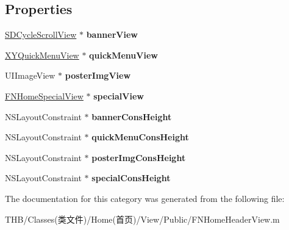 \subsection*{Properties}
\begin{DoxyCompactItemize}
\item 
\mbox{\label{category_f_n_home_header_view_07_08_af37cb7c4de6a8d9a820215c46d24a88c}} 
\mbox{\hyperlink{interface_s_d_cycle_scroll_view}{S\+D\+Cycle\+Scroll\+View}} $\ast$ {\bfseries banner\+View}
\item 
\mbox{\label{category_f_n_home_header_view_07_08_a2f5bf66710f9235beb675e6f5265e090}} 
\mbox{\hyperlink{interface_x_y_quick_menu_view}{X\+Y\+Quick\+Menu\+View}} $\ast$ {\bfseries quick\+Menu\+View}
\item 
\mbox{\label{category_f_n_home_header_view_07_08_a85fddf519f0f967812c1fb0311ae62de}} 
U\+I\+Image\+View $\ast$ {\bfseries poster\+Img\+View}
\item 
\mbox{\label{category_f_n_home_header_view_07_08_a46b32b9b072be4294511331ae5f3ac41}} 
\mbox{\hyperlink{interface_f_n_home_special_view}{F\+N\+Home\+Special\+View}} $\ast$ {\bfseries special\+View}
\item 
\mbox{\label{category_f_n_home_header_view_07_08_a39c38229dc56f5a98762cd55ab34f6b5}} 
N\+S\+Layout\+Constraint $\ast$ {\bfseries banner\+Cons\+Height}
\item 
\mbox{\label{category_f_n_home_header_view_07_08_ae6f2c2144e86d8f184e227287db3925f}} 
N\+S\+Layout\+Constraint $\ast$ {\bfseries quick\+Menu\+Cons\+Height}
\item 
\mbox{\label{category_f_n_home_header_view_07_08_aa357062827f44d01947a705236e7499a}} 
N\+S\+Layout\+Constraint $\ast$ {\bfseries poster\+Img\+Cons\+Height}
\item 
\mbox{\label{category_f_n_home_header_view_07_08_a2db1886c56a83134b7747ad3e5263601}} 
N\+S\+Layout\+Constraint $\ast$ {\bfseries special\+Cons\+Height}
\end{DoxyCompactItemize}


The documentation for this category was generated from the following file\+:\begin{DoxyCompactItemize}
\item 
T\+H\+B/\+Classes(类文件)/\+Home(首页)/\+View/\+Public/F\+N\+Home\+Header\+View.\+m\end{DoxyCompactItemize}
